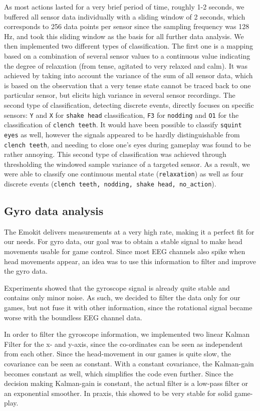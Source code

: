 \documentclass{utue} %
\begin{document}
As most actions lasted for a very brief period of time, roughly 1-2 seconds, we buffered all sensor data individually with a sliding window of 2 seconds, which corresponds to 256 data points per sensor since the sampling frequency was 128 Hz, and took this sliding window as the basis for all further data analysis. We then implemented two different types of classification. The first one is a mapping based on a combination of several sensor values to a continuous value indicating the degree of relaxation (from tense, agitated to very relaxed and calm). It was achieved by taking into account the variance of the sum of all sensor data, which is based on the observation that a very tense state cannot be traced back to one particular sensor, but elicits high variance in several sensor recordings. The second type of classification, detecting discrete events, directly focuses on specific sensors: 
\texttt{Y} and \texttt{X} for \texttt{shake head} classification, \texttt{F3} for \texttt{nodding} and \texttt{O1} for the classification of \texttt{clench teeth}. It would have been possible to classify \texttt{squint eyes} as well, however the signals appeared to be hardly distinguishable from \texttt{clench teeth}, and needing to close one's eyes during gameplay was found to be rather annoying. This second type of classification was achieved through thresholding the windowed sample variance of a targeted sensor. As a result, we were able to classify one continuous mental state (\texttt{relaxation}) as well as four discrete events (\texttt{clench teeth, nodding, shake head, no\_action}).

\subsection{Gyro data analysis}

The Emokit delivers measurements at a very high rate, making it a perfect fit for our needs. For gyro data, our goal was to obtain a stable signal to make head movements usable for game control. Since most EEG channels also spike when head movements appear, an idea was to use this information to filter and improve the gyro data.

Experiments showed that the gyroscope signal is already quite stable and contains only minor noise. As such, we decided to filter the data only for our games, but not fuse it with other information, since the rotational signal became worse with the boundless EEG channel data.

In order to filter the gyroscope information, we implemented two linear Kalman Filter for the x- and y-axis, since the co-ordinates can be seen as independent from each other. Since the head-movement in our games is quite slow, the covariance can be seen as constant. With a constant covariance, the Kalman-gain becomes constant as well, which simplifies the code even further. Since the decision making Kalman-gain is constant, the actual filter is a low-pass filter or an exponential smoother. In praxis, this showed to be very stable for solid game-play. 
\end{document}

